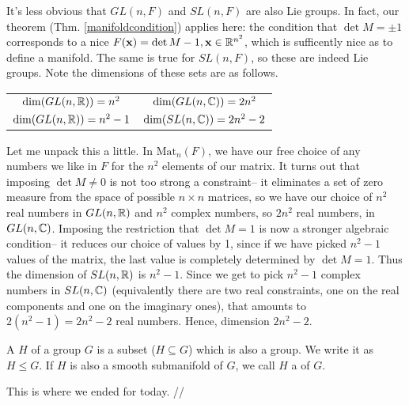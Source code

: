 It's less obvious that $GL(n,F)$ and $SL(n,F)$ are also Lie groups. In fact, our theorem (Thm. \ref{manifoldcondition}) applies here: the condition that $\det M=\pm 1$ corresponds to a nice $F(\boldsymbol{\mathbf{x}})=\det M -1, \boldsymbol{\mathbf{x}}\in \mathbb{R}^{n^2}$, which is sufficently nice as to define a manifold. The same is true for $SL(n,F)$, so these are indeed Lie groups. Note the dimensions of these sets are as follows.
\begin{center}
\begin{tabular}{c c}
$\dim(GL(n,\mathbb{R}))=n^2$ & $\dim(GL(n,\mathbb{C}))=2n^2$\\
$\dim(GL(n,\mathbb{R}))=n^2-1$ & $\dim(SL(n,\mathbb{C}))=2n^2-2$
\end{tabular}
\end{center}
Let me unpack this a little. In $\text{Mat}_n(F)$, we have our free choice of any numbers we like in $F$ for the $n^2$ elements of our matrix. It turns out that imposing $\det M\neq 0$ is not too strong a constraint-- it eliminates a set of zero measure from the space of possible $n\times n$ matrices, so we have our choice of $n^2$ real numbers in $GL(n,\mathbb{R})$ and $n^2$ complex numbers, so $2n^2$ real numbers, in $GL(n,\mathbb{C})$. Imposing the restriction that $\det M =1$ is now a stronger algebraic condition-- it reduces our choice of values by 1, since if we have picked $n^2-1$ values of the matrix, the last value is completely determined by $\det M=1$. Thus the dimension of $SL(n,\mathbb{R})$ is $n^2-1$. Since we get to pick $n^2-1$ complex numbers in $SL(n,\mathbb{C})$ (equivalently there are two real constraints, one on the real components and one on the imaginary ones), that amounts to $2(n^2-1)=2n^2-2$ real numbers. Hence, dimension $2n^2-2$.

\begin{defn}
A  $H$ of a group $G$ is a subset ($H\subseteq G$) which is also a group. We write it as $H\leq G$. If $H$ is also a smooth submanifold of $G$, we call $H$ a  of $G$.
\end{defn}

This is where we ended for today. //

